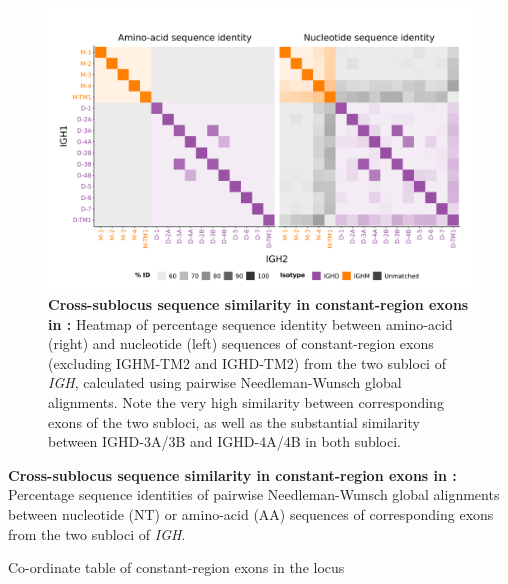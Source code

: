 	\begin{figure}
	\centering
	\includegraphics[width = \textwidth]{_Figures/png/nfu-ch-aln}
	\caption[Cross-sublocus sequence similarity in constant-region exons in \Nfu \textit{IGH}]{\textbf{Cross-sublocus sequence similarity in constant-region exons in \Nfu:} Heatmap of percentage sequence identity between amino-acid (right) and nucleotide (left) sequences of constant-region exons (excluding IGHM-TM2 and IGHD-TM2) from the two subloci of \Nfu \textit{IGH}, calculated using pairwise Needleman-Wunsch global alignments. Note the very high similarity between corresponding exons of the two subloci, as well as the substantial similarity between IGHD-3A/3B and IGHD-4A/4B in both subloci.}
	\label{fig:nfu-ch-aln}
	\end{figure}
	
	\begin{table}\centering
		\caption[Cross-sublocus sequence similarity between corresponding constant-region exons in \Nfu \textit{IGH}]{\textbf{Cross-sublocus sequence similarity in constant-region exons in \Nfu:} Percentage sequence identities of pairwise Needleman-Wunsch global alignments between nucleotide (NT) or amino-acid (AA) sequences of corresponding exons from the two subloci of \Nfu \textit{IGH}.}
	
	\label{tab:nfu-ch-aln}
	\end{table}
	
\begin{table}\centering %
    \caption{Co-ordinate table of constant-region exons in the \nfu \igh{} locus}
    	
    \label{tab:nfu-ch-coords}
\end{table}

